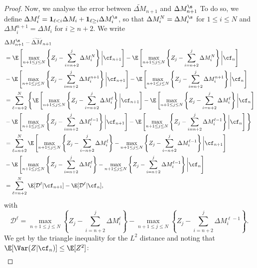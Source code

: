 \begin{proof}
Now, we analyse the error between $\widetilde{\Delta M}_{n+1}$ and $\Delta M^\s_{n+1}$ To do so, we define $\Delta M^\ell_i= \mathbf{1}_{\ell < i}\Delta M_i
+\mathbf{1}_{\ell \ge  i}\Delta M^\s_i$, so that $\Delta M^N_i=\Delta M^\s_i$ for $1\le i\le N$ and $\Delta M^{n+1}_i= \Delta M_i$ for $i\ge n+2$. We write
\begin{align*}
 & \Delta {M}^\s_{n+1}-\widetilde{\Delta {M}}_{n+1}\\
 &= \E\left[ \max_{n + 1\le j \le N} \left\{ Z_{j} - \sum_{i=n+2}^{j} \Delta {M}^N_i \right\}\bigg|\cf_{n+1} \right]-\E\left[\max_{n + 1\le j \le N} \left\{ Z_{j} - \sum_{i=n+2}^{j} \Delta {M}^N_i \right\}\bigg|\cf_{n}\right]\\
  &-\E\left[ \max_{n + 1\le j \le N} \left\{ Z_{j} - \sum_{i=n+2}^{j} \Delta {M}^{n+1}_i \right\}\bigg|\cf_{n+1} \right]-\E\left[\max_{n + 1\le j \le N} \left\{ Z_{j} - \sum_{i=n+2}^{j} \Delta {M}^{n+1}_i \right\}\bigg|\cf_{n}\right]\\
  &=\sum_{\ell=n+2}^{N} \Bigg\{\E\left[ \max_{n + 1\le j \le N} \left\{ Z_{j} - \sum_{i=n+2}^{j} \Delta {M}^{\ell}_i \right\}\bigg|\cf_{n+1} \right]-\E\left[\max_{n + 1\le j \le N} \left\{ Z_{j} - \sum_{i=n+2}^{j} \Delta {M}^\ell_i \right\}\bigg|\cf_{n}\right]\\
  &-\E\left[ \max_{n + 1\le j \le N} \left\{ Z_{j} - \sum_{i=n+2}^{j} \Delta {M}^{\ell-1}_i \right\}\bigg|\cf_{n+1} \right]-\E\left[\max_{n + 1\le j \le N} \left\{ Z_{j} - \sum_{i=n+2}^{j} \Delta {M}^{\ell-1}_i \right\}\bigg|\cf_{n}\right]\Bigg\}\\
  &=\sum_{\ell=n+2}^{N}\E\left[ \max_{n + 1\le j \le N} \left\{ Z_{j} - \sum_{i=n+2}^{j} \Delta {M}^{\ell}_i \right\} - \max_{n + 1\le j \le N} \left\{ Z_{j} - \sum_{i=n+2}^{j} \Delta {M}^{\ell-1}_i \right\}  \bigg|\cf_{n+1} \right] \\
  &-\E\left[ \max_{n + 1\le j \le N} \left\{ Z_{j} - \sum_{i=n+2}^{j} \Delta {M}^{\ell}_i \right\} - \max_{n + 1\le j \le N} \left\{ Z_{j} - \sum_{i=n+2}^{j} \Delta {M}^{\ell-1}_i \right\}  \bigg|\cf_{n} \right] \\
  &=\sum_{\ell=n+2}^{N} \E[\mathcal{D}^\ell |\cf_{n+1}]-\E[\mathcal{D}^\ell |\cf_{n}],
\end{align*}
with 
$$ \mathcal{D}^\ell = \max_{n + 1\le j \le N} \left\{ Z_{j} - \sum_{i=n+2}^{j} \Delta {M}^{\ell}_i \right\} - \max_{n + 1\le j \le N} \left\{ Z_{j} - \sum_{i=n+2}^{j} \Delta {M}^{\ell-1}_i \right\}. $$
We get by the triangle inequality for the $L^2$ distance and noting that $\E[\Var(Z|\cf_{n})]\le \E[Z^2]$:
\begin{align*}

\end{align*}
\end{proof}
